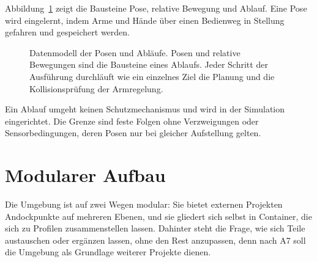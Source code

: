Abbildung~\ref{fig:posen_ablaeufe} zeigt die Bausteine Pose, relative Bewegung und Ablauf.
Eine Pose wird eingelernt, indem Arme und Hände über einen Bedienweg in Stellung gefahren und gespeichert werden.

\begin{figure}[htbp]
  \centering
  
  \caption[Datenmodell der Posen und Abläufe]{Datenmodell der Posen und Abläufe. Posen und relative Bewegungen sind die Bausteine eines Ablaufs. Jeder Schritt der Ausführung durchläuft wie ein einzelnes Ziel die Planung und die Kollisionsprüfung der Armregelung.}
  \label{fig:posen_ablaeufe}
\end{figure}

Ein Ablauf umgeht keinen Schutzmechanismus und wird in der Simulation eingerichtet.
Die Grenze sind feste Folgen ohne Verzweigungen oder Sensorbedingungen, deren Posen nur bei gleicher Aufstellung gelten.

\section{Modularer Aufbau}
\label{sec:erweiterungskonzept}
Die Umgebung ist auf zwei Wegen modular: Sie bietet externen Projekten Andockpunkte auf mehreren Ebenen, und sie gliedert sich selbst in Container, die sich zu Profilen zusammenstellen lassen.
Dahinter steht die Frage, wie sich Teile austauschen oder ergänzen lassen, ohne den Rest anzupassen, denn nach A7 soll die Umgebung als Grundlage weiterer Projekte dienen.

